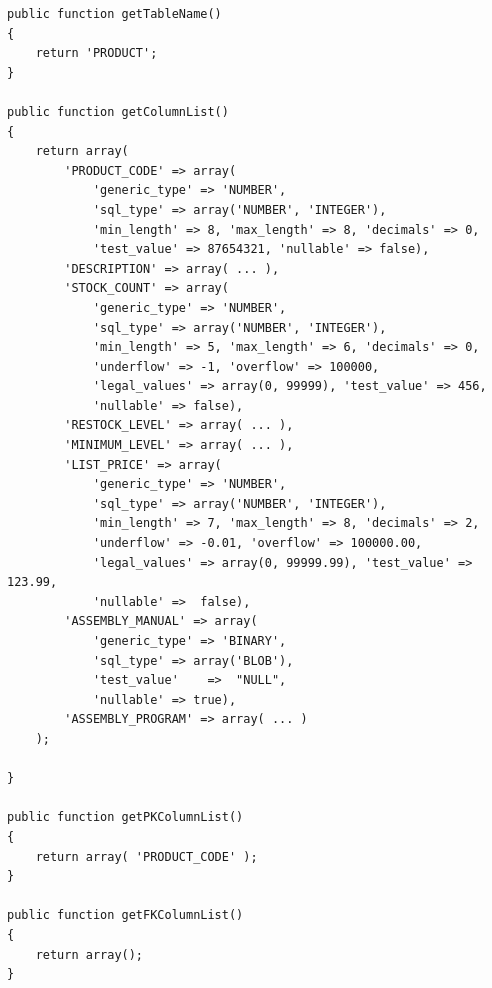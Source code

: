 \documentclass[sigconf, authordraft, capitalise]{acmart}
\begin{document}
\begin{table}
    \footnotesize
    \begin{verbatim}
public function getTableName()
{
    return 'PRODUCT';
}

public function getColumnList()
{
    return array(
        'PRODUCT_CODE' => array(
            'generic_type' => 'NUMBER',
            'sql_type' => array('NUMBER', 'INTEGER'),
            'min_length' => 8, 'max_length' => 8, 'decimals' => 0,
            'test_value' => 87654321, 'nullable' => false),
        'DESCRIPTION' => array( ... ),
        'STOCK_COUNT' => array(
            'generic_type' => 'NUMBER',
            'sql_type' => array('NUMBER', 'INTEGER'),
            'min_length' => 5, 'max_length' => 6, 'decimals' => 0,
            'underflow' => -1, 'overflow' => 100000,
            'legal_values' => array(0, 99999), 'test_value' => 456,
            'nullable' => false),
        'RESTOCK_LEVEL' => array( ... ),
        'MINIMUM_LEVEL' => array( ... ),
        'LIST_PRICE' => array(
            'generic_type' => 'NUMBER',
            'sql_type' => array('NUMBER', 'INTEGER'),
            'min_length' => 7, 'max_length' => 8, 'decimals' => 2,
            'underflow' => -0.01, 'overflow' => 100000.00,
            'legal_values' => array(0, 99999.99), 'test_value' => 123.99,
            'nullable' =>  false),
        'ASSEMBLY_MANUAL' => array(
            'generic_type' => 'BINARY',
            'sql_type' => array('BLOB'),
            'test_value'    =>  "NULL",
            'nullable' => true),
        'ASSEMBLY_PROGRAM' => array( ... )
    );

}

public function getPKColumnList()
{
    return array( 'PRODUCT_CODE' );
}

public function getFKColumnList()
{
    return array();
}   \end{verbatim}
    \caption{Example of table specification}
\end{table}
\end{document}

